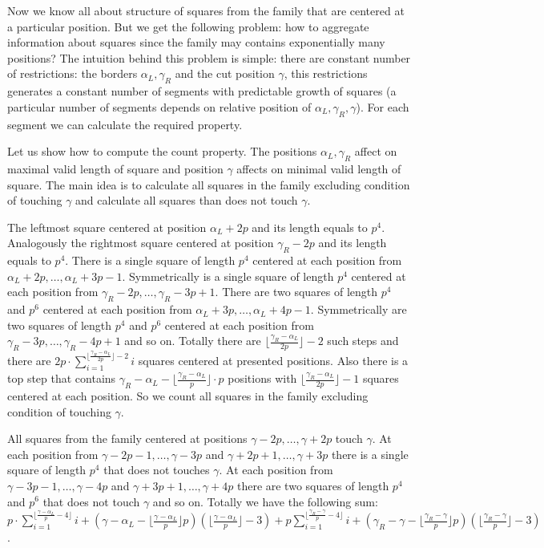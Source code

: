 \documentclass[11pt]{article}
\theoremstyle{break}
\begin{document}
Now we know all about structure of squares from the family that are centered at a particular position. But we get the following problem:
how to aggregate information about squares since the family may contains exponentially many positions? The intuition behind this problem is simple:
there are constant number of restrictions: the borders $\alpha_L, \gamma_R$ and the cut position $\gamma$, this restrictions generates a constant
number of segments with predictable growth of squares (a particular number of segments depends on relative position of $\alpha_L, \gamma_R, \gamma$).
For each segment we can calculate the required property.

Let us show how to compute the count property. The positions $\alpha_L, \gamma_R$ affect on maximal valid length of square and position $\gamma$
affects on minimal valid length of square. The main idea is to calculate all squares in the family excluding condition of touching $\gamma$ and
calculate all squares than does not touch $\gamma$.

The leftmost square centered at position $\alpha_L + 2p$ and its length equals to $p^4$. Analogously the rightmost square centered at position
$\gamma_R - 2p$ and its length equals to $p^4$. There is a single square of length $p^4$ centered at each position from $\alpha_L + 2p, \dots, \alpha_L + 3p - 1$.
Symmetrically is a single square of length $p^4$ centered at each position from $\gamma_R - 2p, \dots, \gamma_R - 3p + 1$. There are two squares of
length $p^4$ and $p^6$ centered at each position from $\alpha_L + 3p, \dots, \alpha_L + 4p - 1$. Symmetrically are two squares of length $p^4$ and $p^6$
centered at each position from $\gamma_R - 3p, \dots, \gamma_R - 4p + 1$ and so on. Totally there are $\lfloor \frac{\gamma_R - \alpha_L}{2p} \rfloor - 2$
such steps and there are $2p \cdot \sum_{i=1}^{\lfloor \frac{\gamma_R - \alpha_L}{2p} \rfloor - 2} i$ squares centered at presented positions.
Also there is a top step that contains $\gamma_R - \alpha_L - \lfloor \frac{\gamma_R -\alpha_L}{p}\rfloor \cdot p$ positions with
$\lfloor \frac{\gamma_R -\alpha_L}{2p}\rfloor - 1$ squares centered at each position. So we count all squares in the family excluding condition of touching $\gamma$.

All squares from the family centered at positions $\gamma - 2p, \dots, \gamma + 2p$ touch $\gamma$. At each position from $\gamma - 2p - 1, \dots, \gamma - 3p$
and $\gamma + 2p + 1, \dots, \gamma + 3p$ there is a single square of length $p^4$ that does not touches $\gamma$. At each position from
$\gamma - 3p - 1, \dots, \gamma - 4p$ and $\gamma + 3p + 1, \dots, \gamma + 4p$ there are two squares of length $p^4$ and $p^6$ that
does not touch $\gamma$ and so on. Totally we have the following sum: $p \cdot \sum_{i=1}^{\lfloor \frac{\gamma - \alpha_L}{p} - 4 \rfloor} i +
(\gamma - \alpha_L - \lfloor \frac{\gamma - \alpha_L}{p} \rfloor p )(\lfloor \frac{\gamma - \alpha_L}{p} \rfloor - 3) +
p \sum_{i = 1}^{\lfloor \frac{\gamma_R - \gamma}{p} - 4 \rfloor} i + (\gamma_R - \gamma - \lfloor \frac{\gamma_R - \gamma}{p} \rfloor p )
(\lfloor \frac{\gamma_R - \gamma}{p} \rfloor - 3)$.
\end{document}
